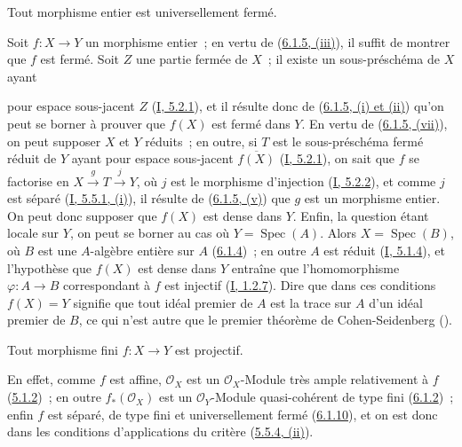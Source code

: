 \begin{proposition}[6.1.10]
\label{II.6.1.10-fr}
Tout morphisme entier est universellement fermé.
\end{proposition}

Soit $f:X\to Y$ un morphisme entier~; en vertu de
(\hyperref[II.6.1.5-fr]{6.1.5, (iii)}), il suffit de montrer que $f$ est
fermé. Soit $Z$ une partie fermée de $X$~; il existe un sous-préschéma de $X$
ayant


pour espace sous-jacent $Z$ (\hyperref[I.5.2.1-fr]{I, 5.2.1}), et il résulte
donc de (\hyperref[II.6.1.5-fr]{6.1.5, (i) et (ii)}) qu'on peut se borner à
prouver que $f(X)$ est fermé dans $Y$. En vertu de
(\hyperref[II.6.1.5-fr]{6.1.5, (vii)}), on peut supposer $X$ et $Y$ réduits~;
en outre, si $T$ est le sous-préschéma fermé réduit de $Y$ ayant pour espace
sous-jacent $\overline{f(X)}$ (\hyperref[I.5.2.1-fr]{I, 5.2.1}), on sait que
$f$ se factorise en $X\xrightarrow{g}T\xrightarrow{j}Y$, où $j$ est le
morphisme d'injection (\hyperref[I.5.2.2-fr]{I, 5.2.2}), et comme $j$ est
séparé (\hyperref[I.5.5.1-fr]{I, 5.5.1, (i)}), il résulte de
(\hyperref[II.6.1.5-fr]{6.1.5, (v)}) que $g$ est un morphisme entier. On peut
donc supposer que $f(X)$ est dense dans $Y$. Enfin, la question étant locale
sur $Y$, on peut se borner au cas où $Y=\operatorname{Spec}(A)$. Alors
$X=\operatorname{Spec}(B)$, où $B$ est une $A$-algèbre entière sur $A$
(\hyperref[II.6.1.4-fr]{6.1.4})~; en outre $A$ est réduit
(\hyperref[I.5.1.4-fr]{I, 5.1.4}), et l'hypothèse que $f(X)$ est dense dans
$Y$ entraîne que l'homomorphisme $\varphi:A\to B$ correspondant à $f$ est
injectif (\hyperref[I.1.2.7-fr]{I, 1.2.7}). Dire que dans ces conditions
$f(X)=Y$ signifie que tout idéal premier de $A$ est la trace sur $A$ d'un
idéal premier de $B$, ce qui n'est autre que le premier théorème de
Cohen-Seidenberg (\cite[t.~I, p.~257, th.~3]{I-13}).

\begin{corollary}[6.1.11]
\label{II.6.1.11-fr}
Tout morphisme fini $f:X\to Y$ est projectif.
\end{corollary}

En effet, comme $f$ est affine, $\mathcal{O}_X$ est un
$\mathcal{O}_X$-Module très ample relativement à $f$
(\hyperref[II.5.1.2-fr]{5.1.2})~; en outre $f_*(\mathcal{O}_X)$ est un
$\mathcal{O}_Y$-Module quasi-cohérent de type fini
(\hyperref[II.6.1.2-fr]{6.1.2})~; enfin $f$ est séparé, de type fini et
universellement fermé (\hyperref[II.6.1.10-fr]{6.1.10}), et on est donc dans
les conditions d'applications du critère
(\hyperref[II.5.5.4-fr]{5.5.4, (ii)}).

